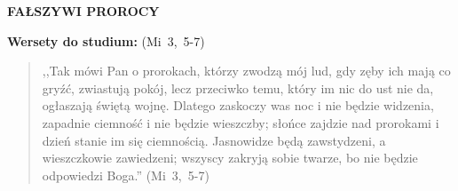 \documentclass[10pt,a4paper,oneside]{article}
\begin{document}
\centerline{\textbf{\MakeUppercase{Fałszywi prorocy}}}
\begin{center}
\textbf{Wersety do studium:} \mbox{(Mi 3, 5-7)}
\end{center}
\begin{quote}
,,Tak mówi Pan o prorokach, którzy zwodzą mój lud, gdy zęby ich mają co gryźć, zwiastują pokój, lecz przeciwko temu, który im nic do ust nie da, ogłaszają świętą wojnę. Dlatego zaskoczy was noc i nie będzie widzenia, zapadnie ciemność i nie będzie wieszczby; słońce zajdzie nad prorokami i dzień stanie im się ciemnością. Jasnowidze będą zawstydzeni, a wieszczkowie zawiedzeni; wszyscy zakryją sobie twarze, bo nie będzie odpowiedzi Boga.'' \mbox{(Mi 3, 5-7)}
\end{quote}
\end{document}
